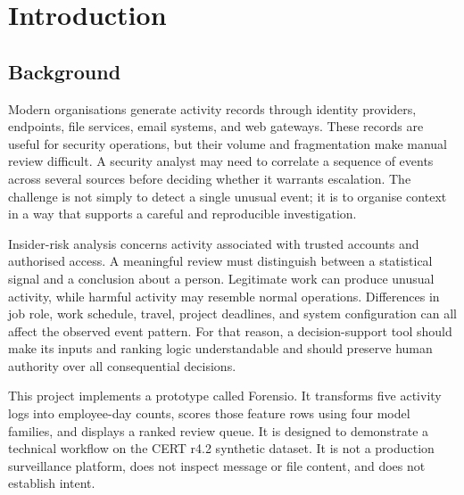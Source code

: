 \renewcommand{\listtablename}{List of tables}
\listoftables

\renewcommand{\listfigurename}{List of figures}
\listoffigures

\clearpage
\pagestyle{frontmatter}
\tableofcontents

\clearpage
{}
\setcounter{page}{1}
\pagestyle{reportstyle}
\onehalfspacing

\chapter{Introduction}
\label{chap:introduction}

\section{Background}
Modern organisations generate activity records through identity
providers, endpoints, file services, email systems, and web gateways.
These records are useful for security operations, but their volume and
fragmentation make manual review difficult. A security analyst may
need to correlate a sequence of events across several sources before
deciding whether it warrants escalation. The challenge is not simply
to detect a single unusual event; it is to organise context in a way
that supports a careful and reproducible investigation.

Insider-risk analysis concerns activity associated with trusted
accounts and authorised access. A meaningful review must distinguish
between a statistical signal and a conclusion about a person.
Legitimate work can produce unusual activity, while harmful activity
may resemble normal operations. Differences in job role, work schedule,
travel, project deadlines, and system configuration can all affect the
observed event pattern. For that reason, a decision-support tool should
make its inputs and ranking logic understandable and should preserve
human authority over all consequential decisions.

This project implements a prototype called Forensio. It transforms
five activity logs into employee-day counts, scores those feature rows
using four model families, and displays a ranked review queue. It is
designed to demonstrate a technical workflow on the CERT r4.2
synthetic dataset. It is not a production surveillance platform, does
not inspect message or file content, and does not establish intent.


